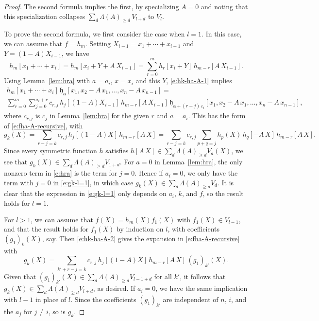 \documentclass[12pt]{amsart}
\theoremstyle{definition}
\theoremstyle{remark}
\newcommand{\aA}{{\mathbf a}}
\newcommand{\fh}{{\mathfrak h}}
\begin{document}
\begin{proof}
The second formula implies the first, by specializing $A=0$ and noting
that this specialization collapses $\sum _{d}\Lambda (A)_{\geq d}\,
V_{l+d}$ to $V_{l}$.


To prove the second formula, we first consider the case when $l=1$. In
this case, we can assume that $f=h_m$.  Setting $X_{i-1} =
x_{1}+\cdots +x_{i-1}$ and $Y=(1-A)X_{i-1}$, we have
\begin{equation}\label{e:hk-ha-A-1}
h_{m}[x_{1} + \cdots + x_{i}] = h_{m}[x_{i} +Y+A\, X_{i-1}] = \sum
_{r=0}^{m} h_{r}[x_{i}+Y] \, h_{m-r}[A\, X_{i-1}].
\end{equation}
Using Lemma~\ref{lem:hra} with $a=a_{i}$, $x=x_{i}$ and this $Y$,
\eqref{e:hk-ha-A-1} implies
\begin{multline}\label{e:hk-ha-A-2}
h_{m}[x_{1} + \cdots + x_{i}]\, \fh_{\aA }[x_{1}, x_{2} - A\, x_{1},
\ldots, x_{n} - A \, x_{n-1}] =\\
\sum _{r=0}^{m} \sum _{j=0}^{a_{i}+r} c_{r,j}\, h_{j}[(1-A)X_{i-1}]\,
h_{m-r}[A\, X_{i-1}]\, \fh_{\aA + (r-j)\, \varepsilon _{i}}[x_{1}, x_{2}
- A\, x_{1}, \ldots, x_{n} - A \, x_{n-1}],
\end{multline}
where $c_{r,j}$ is $c_{j}$ in Lemma~\ref{lem:hra} for the given $r$
and $a=a_{i}$.
This has the form of \eqref{e:fha-A-recursive}, with
\begin{equation}\label{e:gk-l=1}
g_{k}(X) = \sum _{r-j = k} c_{r,j}\, h_{j}[(1-A)X]\, h_{m-r}[A\, X] =
\sum _{r-j = k} c_{r,j} \sum _{p+q = j} h_{p}(X)\, h_{q}[-A\, X]\, h_{m-r}[A\,
X].
\end{equation}
Since every symmetric function $h$ satisfies $h[A\, X]\in \sum _{d}
\Lambda(A) _{\geq d} V_{d}(X)$, we see that $g_{k}(X)\in \sum _{d}
\Lambda (A) _{\geq d} V_{1+d}$.
For $a=0$ in Lemma~\ref{lem:hra}, the
only nonzero term in \eqref{e:hra} is the term for $j=0$. Hence if
$a_{i}=0$, we only have the term with $j=0$ in \eqref{e:gk-l=1}, in which
case $g_{k}(X)\in \sum _{d} \Lambda(A) _{\geq d} V_{d}$.  It is clear
that the expression in \eqref{e:gk-l=1} only depends on $a_{i}$, $k$,
and $f$, so the result holds for $l=1$.

For $l>1$, we can assume that $f(X) = h_{m}(X) f_{1}(X)$ with
$f_{1}(X)\in V_{l-1}$, and that the result holds for $f_{1}(X)$ by
induction on $l$, with coefficients $(g_1)_{k}(X)$, say.  Then
\eqref{e:hk-ha-A-2} gives the expansion in \eqref{e:fha-A-recursive}
with
\begin{equation}\label{e:gk-l>1}
g_{k}(X) = \sum _{k'+r-j = k} c_{r,j}\, h_{j}[(1-A)X]\, h_{m-r}[A\,
X]\, (g_1)_{k'}(X).
\end{equation}
Given that $(g_1)_{k'}(X)\in \sum _{d} \Lambda(A) _{\geq d} V_{l-1+d}$
for all $k'$, it follows that $g_{k}(X)\in \sum _{d} \Lambda(A) _{\geq
d} V_{l+d}$, as desired.  If $a_{i}=0$, we have the same implication
with $l-1$ in place of $l$.  Since the coefficients $(g_1)_{k'}$ are
independent of $n$, $i$, and the $a_{j}$ for $j\not =i$, so is
$g_{k}$.
\end{proof}
\end{document}
